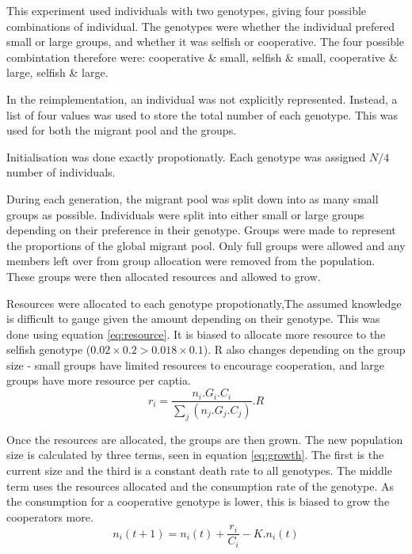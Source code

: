 \documentclass[11pt]{ecsarticle}
\begin{document}
This experiment used individuals with two genotypes, giving four possible combinations of individual.
The genotypes were whether the individual prefered small or large groups, and whether it was selfish or cooperative.
The four possible combintation therefore were: cooperative \& small, selfish \& small, cooperative \& large, selfish \& large. 

In the reimplementation, an individual was not explicitly represented. 
Instead, a list of four values was used to store the total number of each genotype. 
This was used for both the migrant pool and the groups. 

Initialisation was done exactly propotionatly. Each genotype was assigned $N / 4$ number of individuals.

During each generation, the migrant pool was split down into as many small groups as possible.
Individuals were split into either small or large groups depending on their preference in their genotype.
Groups were made to represent the proportions of the global migrant pool. 
Only full groups were allowed and any members left over from group allocation were removed from the population. 
These groups were then allocated resources and allowed to grow. 

Resources were allocated to each genotype propotionatly,The assumed knowledge is difficult to gauge given the amount depending on their genotype.
This was done using equation \eqref{eq:resource}. 
It is biased to allocate more resource to the selfish genotype ($0.02 \times 0.2 > 0.018 \times 0.1$). 
R also changes depending on the group size - small groups have limited resources to encourage cooperation, and large groups have more resource per captia.
\begin{equation}
 r_i = \frac{ n_i . G_i . C_i }{\sum\limits_j (n_j . G_j . C_j )} . R 
 \label{eq:resource}
\end{equation}

Once the resources are allocated, the groups are then grown. 
The new population size is calculated by three terms, seen in equation \ref{eq:growth}. 
The first is the current size and the third is a constant death rate to all genotypes.
The middle term uses the resources allocated and the consumption rate of the genotype.
As the consumption for a cooperative genotype is lower, this is biased to grow the cooperators more.
\begin{equation}
 n_i (t + 1) = n_i (t) + \frac{r_i}{C_i} - K.n_i (t)
 \label{eq:growth}
\end{equation}
\end{document}

